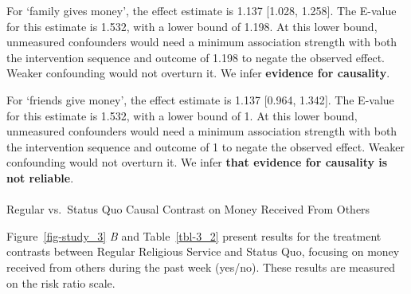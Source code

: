 \documentclass[
  single column]{article}
\makeatletter
\let\oldparagraph\paragraph
\renewcommand{\paragraph}{
    \@ifstar
      \xxxParagraphStar
      \xxxParagraphNoStar
  }
\newcommand{\xxxParagraphStar}[1]{\oldparagraph*{#1}\mbox{}}
\newcommand{\xxxParagraphNoStar}[1]{\oldparagraph{#1}\mbox{}}
\makeatother
\begin{document}
For `family gives money', the effect estimate is 1.137 {[}1.028,
1.258{]}. The E-value for this estimate is 1.532, with a lower bound of
1.198. At this lower bound, unmeasured confounders would need a minimum
association strength with both the intervention sequence and outcome of
1.198 to negate the observed effect. Weaker confounding would not
overturn it. We infer \textbf{evidence for causality}.

For `friends give money', the effect estimate is 1.137 {[}0.964,
1.342{]}. The E-value for this estimate is 1.532, with a lower bound of
1. At this lower bound, unmeasured confounders would need a minimum
association strength with both the intervention sequence and outcome of
1 to negate the observed effect. Weaker confounding would not overturn
it. We infer \textbf{that evidence for causality is not reliable}.

\paragraph{Regular vs.~Status Quo Causal Contrast on Money Received From
Others}\label{regular-vs.-status-quo-causal-contrast-on-money-received-from-others}

Figure~\ref{fig-study_3} \emph{B} and Table~\ref{tbl-3_2} present
results for the treatment contrasts between Regular Religious Service
and Status Quo, focusing on money received from others during the past
week (yes/no). These results are measured on the risk ratio scale.
\end{document}
